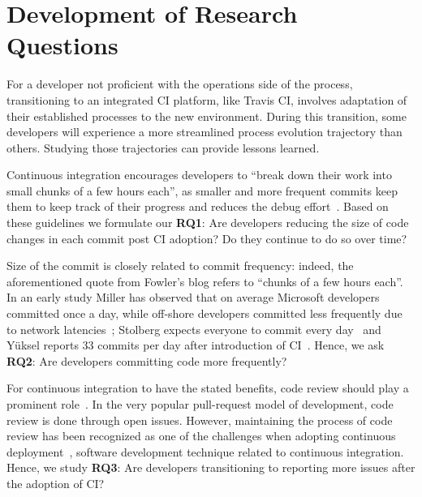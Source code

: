 
\section{Development of Research Questions}
\label{sec:background}

For a developer not proficient with the operations side of the process, transitioning to an integrated CI platform, like Travis CI, involves adaptation of their established processes to the new environment. During this transition, some developers will experience a more streamlined process evolution trajectory than others. Studying those trajectories can provide lessons learned.


%

Continuous integration encourages developers to ``break down their work into small chunks of a few hours each'', 
as smaller and more frequent commits keep them to keep track of their progress and reduces the debug 
effort~\cite{Fowler,Duvall}. %
Based on these guidelines we formulate our \textbf{RQ1}: Are developers reducing the size of code changes in 
each commit post CI adoption? Do they continue to do so over time?

Size of the commit is closely related to commit frequency: indeed, the aforementioned quote from Fowler's blog refers to ``chunks of a few hours each''. 
In an early study Miller has observed that on average Microsoft developers committed once a day, while off-shore
 developers committed less frequently due to network latencies~\cite{Miller}; Stolberg expects everyone to 
 commit every day~\cite{Stolberg} and Y\"{u}ksel reports 33 commits per day after introduction of CI~\cite{Yuksel}. 
Hence, we ask \textbf{RQ2}: Are developers committing code more frequently?

For continuous integration to have the stated benefits, code review should play a prominent role~\cite{Miller}. 
In the very popular pull-request model of development, code review is done through open issues.
However, maintaining the process of code review has been recognized as one of the challenges when 
adopting continuous deployment~\cite{ClapsBSA}, software development technique related to continuous integration.
Hence, we study \textbf{RQ3}: Are developers transitioning to reporting more issues after the adoption of CI?

